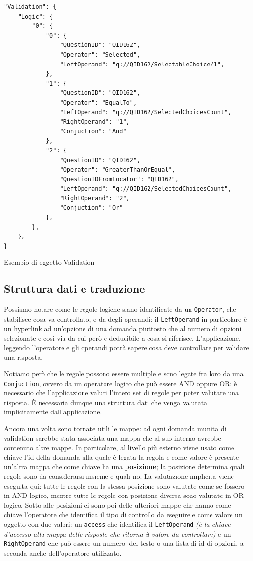 \begin{json}
\begin{verbatim}
"Validation": {
    "Logic": {
        "0": {
            "0": {
                "QuestionID": "QID162",
                "Operator": "Selected",
                "LeftOperand": "q://QID162/SelectableChoice/1",
            },
            "1": {
                "QuestionID": "QID162",
                "Operator": "EqualTo",
                "LeftOperand": "q://QID162/SelectedChoicesCount",
                "RightOperand": "1",
                "Conjuction": "And"
            },
            "2": {
                "QuestionID": "QID162",
                "Operator": "GreaterThanOrEqual",
                "QuestionIDFromLocator": "QID162",
                "LeftOperand": "q://QID162/SelectedChoicesCount",
                "RightOperand": "2",
                "Conjuction": "Or"
            },
        },
    },
}
\end{verbatim}
\caption{Esempio di oggetto Validation}
\label{json:validation}
\end{json}

\subsection{Struttura dati e traduzione}
Possiamo notare come le regole logiche siano identificate da un \texttt{Operator}, che stabilisce cosa va controllato, e da degli operandi: il \texttt{LeftOperand} in particolare è un hyperlink ad un'opzione di una domanda piuttosto che al numero di opzioni selezionate e così via da cui però è deducibile a cosa si riferisce. L'applicazione, leggendo l'operatore e gli operandi potrà sapere cosa deve controllare per validare una risposta.

Notiamo però che le regole possono essere multiple e sono legate fra loro da una \texttt{Conjuction}, ovvero da un operatore logico che può essere AND oppure OR: è necessario che l'applicazione valuti l'intero set di regole per poter valutare una risposta. È necessaria dunque una struttura dati che venga valutata implicitamente dall'applicazione.

Ancora una volta sono tornate utili le mappe: ad ogni domanda munita di validation sarebbe stata associata una mappa che al suo interno avrebbe contenuto altre mappe. In particolare, al livello più esterno viene usato come chiave l'id della domanda alla quale è legata la regola e come valore è presente un'altra mappa che come chiave ha una \textbf{posizione}; la posizione determina quali regole sono da considerarsi insieme e quali no. La valutazione implicita viene eseguita qui: tutte le regole con la stessa posizione sono valutate come se fossero in AND logico, mentre tutte le regole con posizione diversa sono valutate in OR logico.
Sotto alle posizioni ci sono poi delle ulteriori mappe che hanno come chiave l'operatore che identifica il tipo di controllo da eseguire e come valore un oggetto con due valori: un \texttt{access} che identifica il \texttt{LeftOperand} \textit{(è la chiave d'accesso alla mappa delle risposte che ritorna il valore da controllare)} e un \texttt{RightOperand} che può essere un numero, del testo o una lista di id di opzioni, a seconda anche dell'operatore utilizzato.


